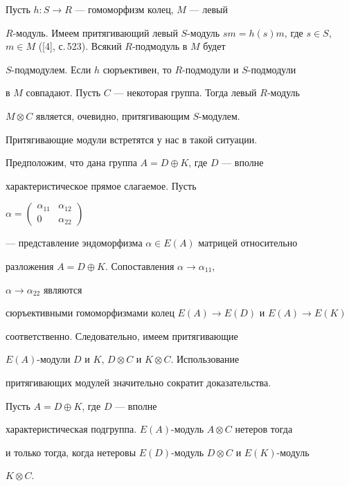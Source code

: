 \begin{notes} 


Пусть $h:S\to R$ --- гомоморфизм колец, $M$ --- левый 


$R$-модуль. Имеем притягивающий левый $S$-модуль $s m=h(s)m$, где $s\in 


S$, $m\in M$ ([4], с.\,523). Всякий $R$-подмодуль в $M$ будет 


$S$-подмодулем. Если $h$ сюръективен, то $R$-подмодули и $S$-подмодули 


в $M$ совпадают. Пусть $C$ --- некоторая группа. Тогда левый $R$-модуль 


$M\otimes C$ является, очевидно, притягивающим $S$-модулем. 


Притягивающие модули встретятся у нас в такой ситуации. 


Предположим, что дана группа $A=D\oplus K$, где $D$ --- вполне 


характеристическое прямое слагаемое. Пусть 


$\alpha=\left(\begin{smallmatrix} \alpha_{11} & \alpha_{12} \\ 


0 & \alpha_{22}\end{smallmatrix}\right)$ 


--- представление эндоморфизма $\alpha\in E(A)$ матрицей относительно 


разложения $A=D\oplus K$. Сопоставления $\alpha\to\alpha_{11}$, 


$\alpha\to\alpha_{22}$ являются 


сюръективными гомоморфизмами колец $E(A)\to E(D)$ и $E(A)\to E(K)$ 


соответственно. Следовательно, имеем притягивающие 


$E(A)$-модули $D$ и $K$, $D\otimes C$ и $K\otimes C$. Использование 


притягивающих модулей значительно сократит доказательства. 


\end{notes} 


 


\begin{cors} 


Пусть $A=D\oplus K$, где $D$ --- вполне 


характеристическая подгруппа.\; $E(A)$-модуль $A\otimes C$ нетеров тогда 


и только тогда, когда нетеровы $E(D)$-модуль $D\otimes C$ и $E(K)$-модуль 


$K\otimes C$. 


\end{cors} 



